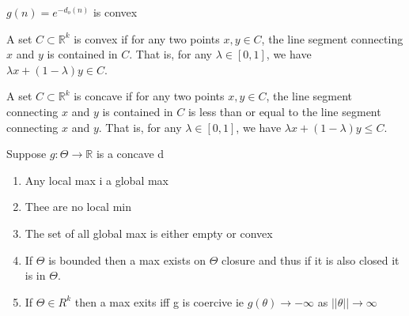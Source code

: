 \documentclass[answers,12pt,addpoints]{exam}
\begin{document}

\begin{remark}
    $g(n) = e^{-d_o(n)}$ is convex
\end{remark}
\begin{definition}
    A set $C \subset \mathbb{R}^k$ is convex if for any two points $x,y \in C$, the line segment connecting $x$ and $y$ is contained in $C$. That is, for any $\lambda \in [0,1]$, we have $\lambda x + (1-\lambda)y \in C$.
\end{definition}

\begin{definition}
    A set $C \subset \mathbb{R}^k$ is concave if for any two points $x,y \in C$, the line segment connecting $x$ and $y$ is contained in $C$ is less than or equal to the line segment connecting $x$ and $y$. That is, for any $\lambda \in [0,1]$, we have $\lambda x + (1-\lambda)y \leq C$.
\end{definition}

\begin{lemma}
    Suppose $g: \Theta \to \mathbb{R}$ is a concave d
    \begin{enumerate}
        \item Any local max i a global max
        \item Thee are no local min
        \item The set of all global max is either empty or convex
        \item If $\Theta$ is bounded then a max exists on $\Theta$ closure and thus if it is also closed it is in $\Theta$.
        \item If $\Theta \in R^k$ then a max exits iff g is coercive ie $g(\theta) \to -\infty$ as $||\theta|| \to \infty$
    \end{enumerate}
\end{lemma}
\end{document}
